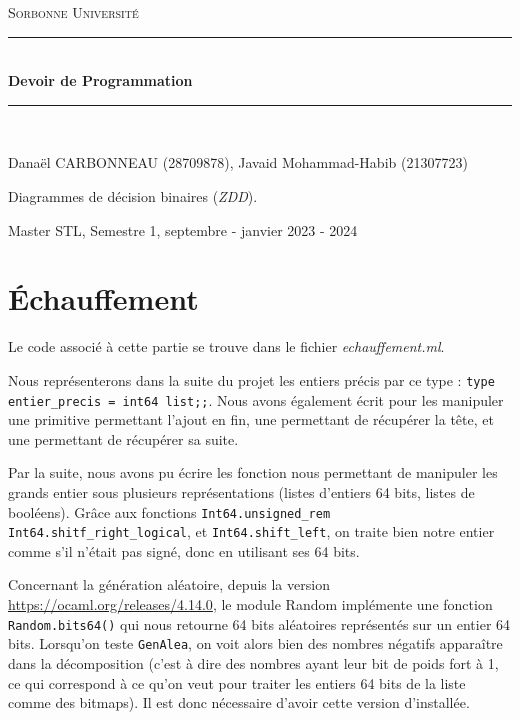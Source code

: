 \documentclass[12pt,a4paper]{article}
\author{Javaid Mohammad-Habib, Carbonneau Danaël}
\begin{document}
\begin{titlepage}
\newcommand{\HRule}{\rule{\linewidth}{0.5mm}}



\center 
\bigskip
\textsc{\LARGE
Sorbonne Université
}
 \\[4cm]
 \HRule \\[0.4cm]
{ \huge \bfseries Devoir de Programmation \\[0.15cm] }

\HRule \\[2cm]

\begin{large}
Danaël CARBONNEAU (28709878), Javaid Mohammad-Habib (21307723) \\
\end{large}

\begin{huge}
Diagrammes de décision binaires (\textit{ZDD}).
\end{huge}

\vfill

Master STL, Semestre 1, septembre - janvier 2023 - 2024 \\ [1cm]

\end{titlepage}



\tableofcontents



\section{Échauffement}

Le code associé à cette partie se trouve dans le fichier \textit{echauffement.ml}. 

Nous représenterons dans la suite du projet les entiers précis par ce type : \texttt{type entier\_precis = int64 list;;}. Nous avons également écrit pour les manipuler une primitive permettant l'ajout en fin, une permettant de récupérer la tête, et une permettant de récupérer sa suite.

Par la suite, nous avons pu écrire les fonction nous permettant de manipuler les grands entier sous plusieurs représentations (listes d'entiers 64 bits, listes de booléens). Grâce aux fonctions \texttt{Int64.unsigned\_rem} \texttt{Int64.shitf\_right\_logical}, et \texttt{Int64.shift\_left}, on traite bien notre entier comme s'il n'était pas signé, donc en utilisant ses 64 bits.

Concernant la génération aléatoire, depuis la version \href{4.14}{https://ocaml.org/releases/4.14.0}, le module Random implémente une fonction \texttt{Random.bits64()} qui nous retourne 64 bits aléatoires représentés sur un entier 64 bits. Lorsqu'on teste \texttt{GenAlea}, on voit alors bien des nombres négatifs apparaître dans la décomposition (c'est à dire des nombres ayant leur bit de poids fort à 1, ce qui correspond à ce qu'on veut pour traiter les entiers 64 bits de la liste comme des bitmaps). Il est donc nécessaire d'avoir cette version d'installée.
\end{document}
